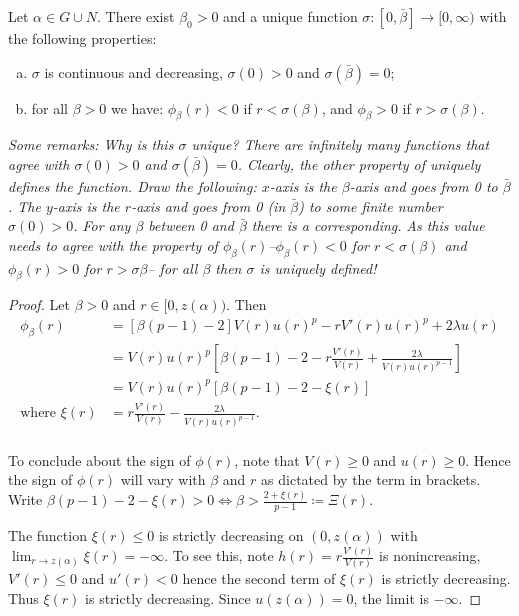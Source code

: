 \newpage
\begin{lemma}Let $\alpha\in G\cup N$. There exist $\beta_0>0$ and a unique function $\sigma:[0,\bar\beta]\to[0,\infty)$ with the following properties: \begin{enumerate}[(a)]
	\item  $\sigma$ is continuous and decreasing, $\sigma(0)>0$ and $\sigma(\bar\beta)=0$;
    \item for all $\beta>0$ we have: $\phi_\beta(r)<0$ if $r<\sigma(\beta)$, and $\phi_\beta>0$ if $r>\sigma(\beta)$.
\end{enumerate}
\emph{Some remarks: Why is this $\sigma$ unique? There are infinitely many functions that agree with $\sigma(0)>0$ and $\sigma(\bar{\beta})=0$. Clearly, the other property of \sigma uniquely defines the function. Draw the following: $x$-axis is the $\beta$-axis and goes from 0 to $\bar{\beta}$. The $y$-axis is the $r$-axis and goes from 0 (in $\bar{\beta}$) to some finite number $\sigma(0)>0$. For any $\beta$ between 0 and $\bar{\beta}$ there is a corresponding.}%
\emph{As this value needs to agree with the property of $\phi_{\beta}(r)$--$\phi_{\beta}(r)<0$ for $r<\sigma(\beta)$ and $\phi_{\beta}(r)>0$ for $r>\sigma{\beta}$-- for all $\beta$ then $\sigma$ is uniquely defined!}
\begin{proof}
Let $\beta>0$ and $r\in[0,z(\alpha))$. Then \begin{align*}
\phi_{\beta}(r)&=\left[\beta(p-1)-2\right]V(r)u(r)^p-rV'(r)u(r)^p+2\lambda u(r) %
\\ &=V(r)u(r)^p\left[\beta(p-1)-2-r\frac{V'(r)}{V(r)}+\frac{2\lambda}{V(r)u(r)^{p-1}}\right]
\\ &= V(r)u(r)^p\left[\beta(p-1)-2-\xi(r)\right]
\\\text{where }\xi(r)&=r\frac{V'(r)}{V(r)}-\frac{2\lambda}{V(r)u(r)^{p-1}}.
\end{align*}
\\
To conclude about the sign of $\phi(r)$, note that $V(r)\geq0$ and $u(r)\geq0$. Hence the sign of $\phi(r)$ will vary with $\beta$ and $r$ as dictated by the term in brackets. Write $\beta(p-1)-2-\xi(r)>0\iff\beta>\frac{2+\xi(r)}{p-1}\coloneqq\Xi(r)$.

The function $\xi(r)\leq0$ is strictly decreasing on $(0,z(\alpha))$ with $\lim_{r\to z(\alpha)}\xi(r)=-\infty$. To see this, note $h(r)=r\frac{V'(r)}{V(r)}$ is nonincreasing, $V'(r)\leq0$ and $u'(r)<0$ hence the second term of $\xi(r)$ is strictly decreasing. Thus $\xi(r)$ is strictly decreasing. Since $u(z(\alpha))=0$, the limit is $-\infty$.


\end{proof}
\end{lemma}
